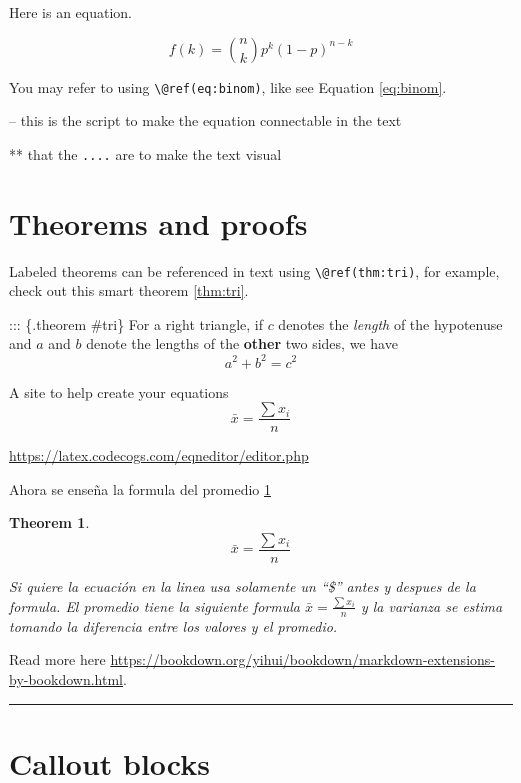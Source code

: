 \documentclass[
]{book}
\newtheorem{theorem}{Theorem}[chapter]
\theoremstyle{definition}
\theoremstyle{definition}
\theoremstyle{definition}
\theoremstyle{definition}
\theoremstyle{remark}
\begin{document}
Here is an equation.

\begin{equation} 
  f\left(k\right) = \binom{n}{k} p^k\left(1-p\right)^{n-k}
  \label{eq:binom} 
\end{equation}

You may refer to using \texttt{\textbackslash{}@ref(eq:binom)}, like see Equation \eqref{eq:binom}.

-- this is the script to make the equation connectable in the text

** that the \texttt{....} are to make the text visual

\section{Theorems and proofs}\label{theorems-and-proofs}

Labeled theorems can be referenced in text using \texttt{\textbackslash{}@ref(thm:tri)}, for example, check out this smart theorem \ref{thm:tri}.

::: \{.theorem \#tri\}
For a right triangle, if \(c\) denotes the \emph{length} of the hypotenuse
and \(a\) and \(b\) denote the lengths of the \textbf{other} two sides, we have
\[a^2 + b^2 = c^2\]

A site to help create your equations \[\bar{x}=\frac{\sum x_{i}}{n}\]

\url{https://latex.codecogs.com/eqneditor/editor.php}

Ahora se enseña la formula del promedio \ref{thm:promedio}

\begin{theorem}
\protect\hypertarget{thm:promedio}{}\label{thm:promedio}\[\bar{x}= \frac{\sum x_{i}}{n}\]

Si quiere la ecuación en la linea usa solamente un ``\$'' antes y despues de la formula.
El promedio tiene la siguiente formula \(\bar{x}= \frac{\sum x_{i}}{n}\) y la varianza se estima tomando la diferencia entre los valores y el promedio.
\end{theorem}

Read more here \url{https://bookdown.org/yihui/bookdown/markdown-extensions-by-bookdown.html}.

\begin{center}\rule{0.5\linewidth}{0.5pt}\end{center}

\section{Callout blocks}\label{callout-blocks}
\end{document}

